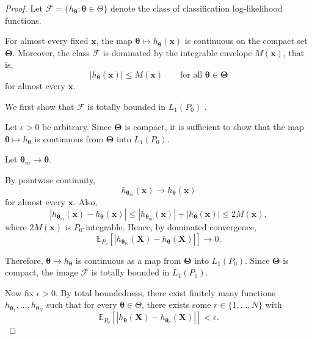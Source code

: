 \documentclass[pdflatex,sn-mathphys-ay]{sn-jnl}%
\let\oldtheta\theta
\renewcommand{\theta}{\boldsymbol{\oldtheta}}
\theoremstyle{thmstyleone}%
\theoremstyle{thmstyletwo}%
\theoremstyle{thmstylethree}%
\begin{document}
\begin{proof}

Let
   $ \mathcal{F}
    =
    \{
    h_{\boldsymbol{\theta}}
    :
    \boldsymbol{\theta}\in\Theta
    \}$ denote the class of classification log-likelihood functions.

For almost every fixed $\mathbf{x}$, the map
    $\boldsymbol{\theta}
    \mapsto
    h_{\boldsymbol{\theta}}(\mathbf{x})$ is continuous on the compact set $\boldsymbol{\Theta}$. Moreover, the class
    $\mathcal{F}$ is dominated by the integrable envelope
    $M(\mathbf{x})$,
that is,
\[
    |h_{\boldsymbol{\theta}}(\mathbf{x})|
    \leq
    M(\mathbf{x})
    \qquad
    \text{for all }
    \boldsymbol{\theta}\in \boldsymbol{\Theta}
\]
for almost every $\mathbf{x}$.

We first show that $ \mathcal{F}$ is totally bounded in $    L_1(P_0)$ .


Let $\epsilon>0$ be arbitrary. Since $\boldsymbol{\Theta}$ is compact, it is sufficient to show that the map
    $\boldsymbol{\theta}
    \mapsto
    h_{\boldsymbol{\theta}}$
is continuous from $\boldsymbol{\Theta}$ into
   $ L_1(P_0)$.


Let
   $ \boldsymbol{\theta}_m
    \to
    \boldsymbol{\theta}$.

By pointwise continuity,
\[
    h_{\boldsymbol{\theta}_m}(\mathbf{x})
    \to
    h_{\boldsymbol{\theta}}(\mathbf{x})
\]
for almost every $\mathbf{x}$. Also,
\[
    |h_{\boldsymbol{\theta}_m}(\mathbf{x})
    -
    h_{\boldsymbol{\theta}}(\mathbf{x})|
    \leq
    |h_{\boldsymbol{\theta}_m}(\mathbf{x})|
    +
    |h_{\boldsymbol{\theta}}(\mathbf{x})|
    \leq
    2M(\mathbf{x}),
\]
where $2M(\mathbf{x})$ is $P_0$-integrable. Hence, by dominated convergence,
\[
    \mathbb{E}_{P_0}
    \left[
        |h_{\boldsymbol{\theta}_m}(\mathbf{X})
        -
        h_{\boldsymbol{\theta}}(\mathbf{X})|
    \right]
    \to
    0.
\]

Therefore, $\boldsymbol{\theta}
    \mapsto
    h_{\boldsymbol{\theta}}$ is continuous as a map from $\boldsymbol{\Theta}$ into
    $L_1(P_0)$. Since $\boldsymbol{\Theta}$ is compact, the image $\mathcal{F}$ is totally bounded in $ L_1(P_0)$.

Now fix $\epsilon>0$. By total boundedness, there exist finitely many functions
   $ h_{\boldsymbol{\theta}_1},
    \ldots,
    h_{\boldsymbol{\theta}_N}$ such that for every $ \boldsymbol{\theta}\in\Theta$, there exists some $r\in\{1,\ldots,N\}$
with
\[
    \mathbb{E}_{P_0}
    \left[
        |h_{\boldsymbol{\theta}}(\mathbf{X})
        -
        h_{\boldsymbol{\theta}_r}(\mathbf{X})|
    \right]
    <
    \epsilon.
\]


\end{proof}
\end{document}
